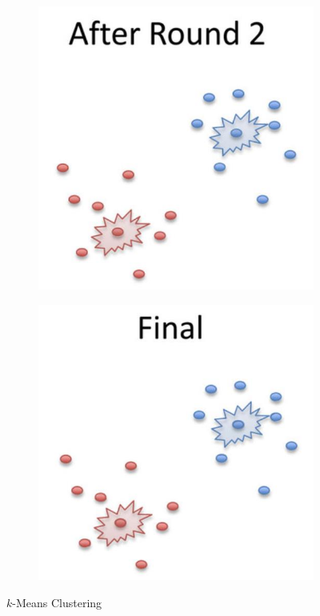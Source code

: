 \documentclass[
	number={6},
	title={Clustering}
]{cs584notes}
\begin{document}
\begin{figure}[H]
\begin{subfigure}[m]{0.24\textwidth}
	\end{subfigure}
	\begin{subfigure}[m]{0.24\textwidth}
		\centering
		\includegraphics[width=\textwidth]{figures/6/k_means_example_2}
	\end{subfigure}
	\begin{subfigure}[m]{0.24\textwidth}
		\centering
		\includegraphics[width=\textwidth]{figures/6/k_means_example_3}
	\end{subfigure}
	\caption{$k$-Means Clustering}
	\label{fig:k-means-clustering}
\end{figure}
\end{document}
